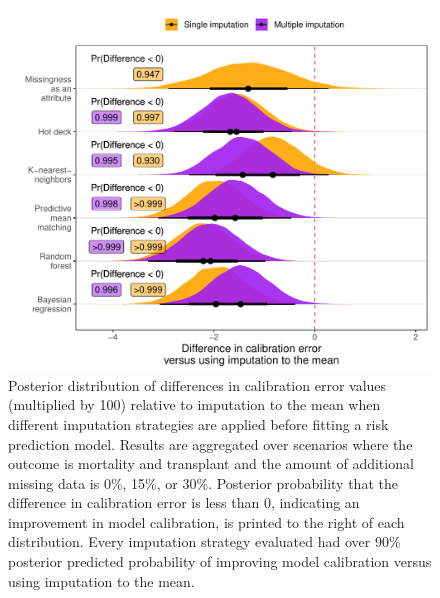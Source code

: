 \documentclass{article}
\begin{document}
\begin{figure}

{\centering \includegraphics{doc_arxiv_files/figure-latex/fig_md_strat_infer_cal_error-1} 

}

\caption{Posterior distribution of differences in calibration error values (multiplied by 100) relative to imputation to the mean when different imputation strategies are applied before fitting a risk prediction model. Results are aggregated over scenarios where the outcome is mortality and transplant and the amount of additional missing data is 0\%, 15\%, or 30\%. Posterior probability that the difference in calibration error is less than 0, indicating an improvement in model calibration, is printed to the right of each distribution. Every imputation strategy evaluated had over 90\% posterior predicted probability of improving model calibration versus using imputation to the mean.}\label{fig:fig_md_strat_infer_cal_error}
\end{figure}

\clearpage



\end{document}
